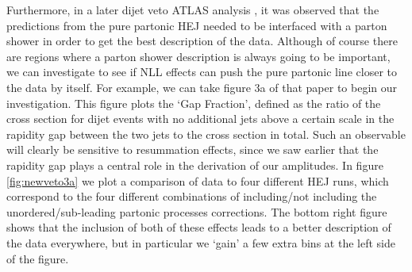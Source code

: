 Furthermore, in a later dijet veto ATLAS analysis \cite{Aad2014}, it was observed that the predictions from the pure partonic HEJ needed to be interfaced with a parton shower in order to get the best description of the data. Although of course there are regions where a parton shower description is always going to be important, we can investigate to see if NLL effects can push the pure partonic line closer to the data by itself. For example, we can take figure 3a of that paper to begin our investigation. This figure plots the `Gap Fraction', defined as the ratio of the cross section for dijet events with no additional jets above a certain scale in the rapidity gap between the two jets to the cross section in total. Such an observable will clearly be sensitive to resummation effects, since we saw earlier that the rapidity gap plays a central role in the derivation of our amplitudes. In figure \ref{fig:newveto3a} we plot a comparison of data to four different HEJ runs, which correspond to the four different combinations of including/not including the unordered/sub-leading partonic processes corrections. The bottom right figure shows that the inclusion of both of these effects leads to a better description of the data everywhere, but in particular we `gain' a few extra bins at the left side of the figure. 

